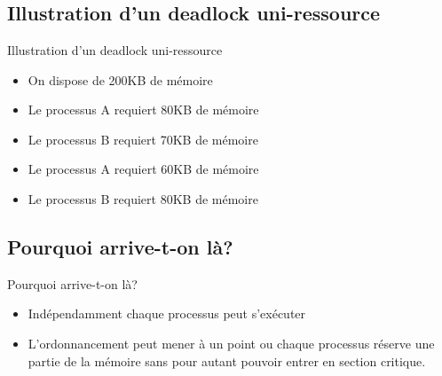 \section{\sectitle}
\begin{frame}{\sectitle}
    \def\subsectitle{Illustration d'un deadlock uni-ressource}
    \subsection{\subsectitle}

    \begin{alertblock}{\subsectitle}
        \begin{itemize}
            \item On dispose de 200KB de mémoire
            \item Le processus A requiert 80KB de mémoire
            \item Le processus B requiert 70KB de mémoire
            \item Le processus A requiert 60KB de mémoire
            \item Le processus B requiert 80KB de mémoire
        \end{itemize}
    \end{alertblock}

    \def\subsectitle{Pourquoi arrive-t-on là?}
    \subsection{\subsectitle}
    \begin{block}{\subsectitle}
        \begin{itemize}
            \item Indépendamment chaque processus peut s'exécuter
            \item L'ordonnancement peut mener à un point ou chaque processus
                réserve une partie de la mémoire sans pour autant pouvoir entrer
                en section critique.
        \end{itemize}
    \end{block}
\end{frame}

\def\sectitle{Exemple avec deux sémaphores}
